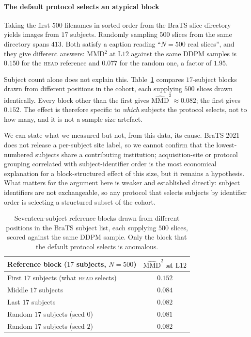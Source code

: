 \documentclass[preprint,12pt,authoryear]{elsarticle}
\newcommand{\mmd}{\mathrm{MMD}}
\newcommand{\Lb}[1]{\ensuremath{\mathrm{L}#1}}
\begin{document}
\paragraph{The default protocol selects an atypical block}
Taking the first $500$ filenames in sorted order from the BraTS slice directory
yields images from $17$ subjects. Randomly sampling $500$ slices from the same
directory spans $413$. Both satisfy a caption reading ``$N = 500$ real
slices'', and they give different answers: MMD$^2$ at \Lb{12} against the same
DDPM samples is $0.150$ for the \textsc{head} reference and $0.077$ for the
random one, a factor of $1.95$.

Subject count alone does not explain this. Table~\ref{tab:blocks} compares
$17$-subject blocks drawn from different positions in the cohort, each
supplying $500$ slices drawn identically. Every block other than the first
gives $\widehat{\mmd}^2 \approx 0.082$; the first gives $0.152$. The effect is
therefore specific to \emph{which} subjects the protocol selects, not to how
many, and it is not a sample-size artefact.

We can state what we measured but not, from this data, its cause. BraTS 2021
does not release a per-subject site label, so we cannot confirm that the
lowest-numbered subjects share a contributing institution; acquisition-site or
protocol grouping correlated with subject-identifier order is the most
economical explanation for a block-structured effect of this size, but it
remains a hypothesis. What matters for the argument here is weaker and
established directly: subject identifiers are not exchangeable, so any protocol
that selects subjects by identifier order is selecting a structured subset of
the cohort.

\begin{table}[t]
\centering
\caption{Seventeen-subject reference blocks drawn from different positions in
the BraTS subject list, each supplying $500$ slices, scored against the same
DDPM sample. Only the block that the default protocol selects is anomalous.}
\label{tab:blocks}
\begin{tabular}{lc}
\toprule
Reference block ($17$ subjects, $N = 500$) & $\widehat{\mmd}^2$ at \Lb{12} \\
\midrule
First $17$ subjects (what \textsc{head} selects) & $0.152$ \\
Middle $17$ subjects                             & $0.084$ \\
Last $17$ subjects                               & $0.082$ \\
Random $17$ subjects (seed $0$)                  & $0.081$ \\
Random $17$ subjects (seed $2$)                  & $0.082$ \\
\bottomrule
\end{tabular}
\end{table}
\end{document}
